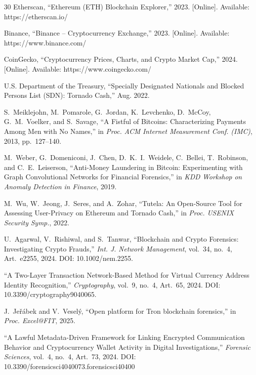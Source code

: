 \documentclass[journal]{IEEEtran}
\begin{document}
\begin{thebibliography}{30}
    Etherscan, ``Ethereum (ETH) Blockchain Explorer,'' 2023. [Online]. Available: https://etherscan.io/
    
    Binance, ``Binance -- Cryptocurrency Exchange,'' 2023. [Online]. Available: https://www.binance.com/
    
    CoinGecko, ``Cryptocurrency Prices, Charts, and Crypto Market Cap,'' 2024. [Online]. Available: https://www.coingecko.com/
    
    U.S. Department of the Treasury, ``Specially Designated Nationals and Blocked Persons List (SDN): Tornado Cash,'' Aug. 2022.
    
    S.~Meiklejohn, M.~Pomarole, G.~Jordan, K.~Levchenko, D.~McCoy, G.~M.~Voelker, and S.~Savage, ``A Fistful of Bitcoins: Characterizing Payments Among Men with No Names,'' in \textit{Proc. ACM Internet Measurement Conf. (IMC)}, 2013, pp.~127--140.
    
    M.~Weber, G.~Domeniconi, J.~Chen, D.~K.~I.~Weidele, C.~Bellei, T.~Robinson, and C.~E.~Leiserson, ``Anti-Money Laundering in Bitcoin: Experimenting with Graph Convolutional Networks for Financial Forensics,'' in \textit{KDD Workshop on Anomaly Detection in Finance}, 2019.
    
    M.~Wu, W.~Jeong, J.~Seres, and A.~Zohar, ``Tutela: An Open-Source Tool for Assessing User-Privacy on Ethereum and Tornado Cash,'' in \textit{Proc. USENIX Security Symp.}, 2022.
    
    U.~Agarwal, V.~Rishiwal, and S.~Tanwar, ``Blockchain and Crypto Forensics: Investigating Crypto Frauds,'' \textit{Int. J. Network Management}, vol.~34, no.~4, Art.~e2255, 2024. DOI: 10.1002/nem.2255.
    
    ``A Two-Layer Transaction Network-Based Method for Virtual Currency Address Identity Recognition,'' \textit{Cryptography}, vol.~9, no.~4, Art.~65, 2024. DOI: 10.3390/cryptography9040065.
    
    J.~Je{\v{r}}{\'a}bek and V.~Vesel{\'y}, ``Open platform for Tron blockchain forensics,'' in \textit{Proc. Excel@FIT}, 2025.
    
    ``A Lawful Metadata-Driven Framework for Linking Encrypted Communication Behavior and Cryptocurrency Wallet Activity in Digital Investigations,'' \textit{Forensic Sciences}, vol.~4, no.~4, Art.~73, 2024. DOI: 10.3390/forensicsci4040073.forensicsci40400
    

\end{thebibliography}
\end{document}
